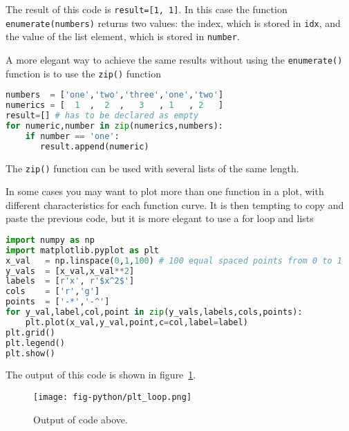 \documentclass[graybox,sectrefs,envcountresetchap,open=right,final]{svmonodo}
\begin{document}
The result of this code is \texttt{result=[1, 1]}. In this case the function \texttt{enumerate(numbers)} returns two values: the index, which is stored in \texttt{idx}, and the value of the list element, which is stored in \texttt{number}.

A more elegant way to achieve the same results without using the \texttt{enumerate()} function is to use the \texttt{zip()} function







\begin{lstlisting}[language=python,style=blue1bar]
numbers  = ['one','two','three','one','two']
numerics = [  1  ,  2  ,   3   , 1   , 2   ]
result=[] # has to be declared as empty
for numeric,number in zip(numerics,numbers):
    if number == 'one':
       result.append(numeric) 

\end{lstlisting}

The \texttt{zip()} function can be used with several lists of the same length.

In some cases you may want to plot more than one function in a plot, with different characteristics for each function curve. It is then tempting to copy and paste the previous code, but it is more elegant to use a for loop and lists













\begin{lstlisting}[language=python,style=blue1bar]
import numpy as np
import matplotlib.pyplot as plt
x_val   = np.linspace(0,1,100) # 100 equal spaced points from 0 to 1
y_vals  = [x_val,x_val**2]
labels  = [r'x', r'$x^2$']
cols    = ['r','g']
points  = ['-*','-^']
for y_val,label,col,point in zip(y_vals,labels,cols,points):
    plt.plot(x_val,y_val,point,c=col,label=label)
plt.grid()
plt.legend()
plt.show()

\end{lstlisting}

The output of this code is shown in figure~\ref{fig:python:loop}.

\begin{figure}[!ht]  %
  \centerline{\texttt{[image: fig-python/plt\_loop.png]}}
  \caption{
  Output of code above. \label{fig:python:loop}
  }
\end{figure}
\end{document}
